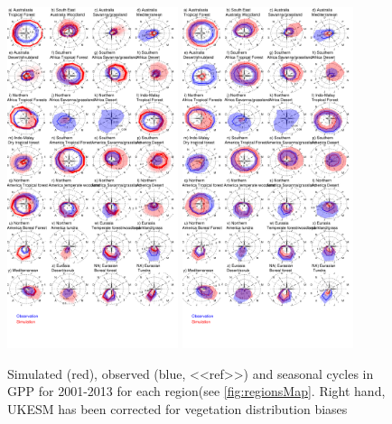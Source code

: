 \documentclass[bg, manuscript]{copernicus}
\begin{document}
\begin{figure}[t]
        \includegraphics[width=5cm]{figs/GPP/fire_var_seasonality-TS-control-gpp.png}
        \includegraphics[width=5cm]{figs/GPP/fire_var_seasonality-TS-obsVegDist-gpp.png}
    
    \caption{Simulated (red), observed (blue, <<ref>>) and seasonal cycles in GPP for 2001-2013 for each region(see \ref{fig:regionsMap}. Right hand, UKESM has been corrected for vegetation distribution biases \label{fig:GPPseasonalTS}}
\end{figure}
\end{document}
